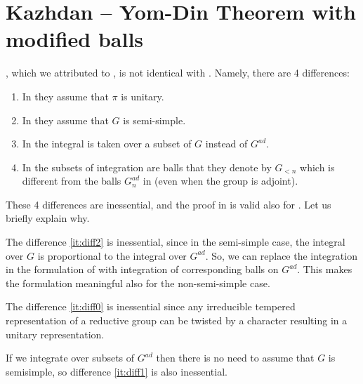 \documentclass[12pt,a4paper]{amsart}%
\begin{document}
\section{Kazhdan -- Yom-Din Theorem with modified balls}\label{sec:KY}
, which we attributed to \cite{KYtempered}, is not identical with
\cite[Proposition~1.10]{KYtempered}.
Namely, there are 4 differences:
\begin{enumerate}
    \item\label{it:diff0} In \cite{KYtempered} they assume that $\pi$  is unitary.
    \item\label{it:diff1} In \cite{KYtempered} they assume that $G$  is semi-simple.
    \item\label{it:diff2} In \cite{KYtempered} the integral is taken over a subset of $G$ instead of $G^{ad}$.
    \item\label{it:diff3} In \cite{KYtempered} the subsets of integration are balls that they denote by $G_{<n}$ which is different from the balls $G^{ad}_{n}$ in  (even when the group is adjoint). 
\end{enumerate}

These 4 differences are inessential, and the proof in \cite[Proposition~1.10]{KYtempered} is valid also for . Let us briefly explain why. 

The difference \eqref{it:diff2} is inessential, since in the semi-simple case, the integral over  $G$ is proportional to the integral over $G^{ad}$. So, we can replace the integration in the formulation of \cite[Proposition~1.10]{KYtempered} with integration of corresponding balls on $G^{ad}$. This makes the formulation meaningful also for the non-semi-simple case.

The difference \eqref{it:diff0} is inessential since any irreducible tempered representation of a reductive group can be twisted by a character resulting in a unitary representation.

If we integrate over subsets of $G^{ad}$ then there is no need to assume that $G$ is semisimple, so difference \eqref{it:diff1} is also inessential.
\end{document}
